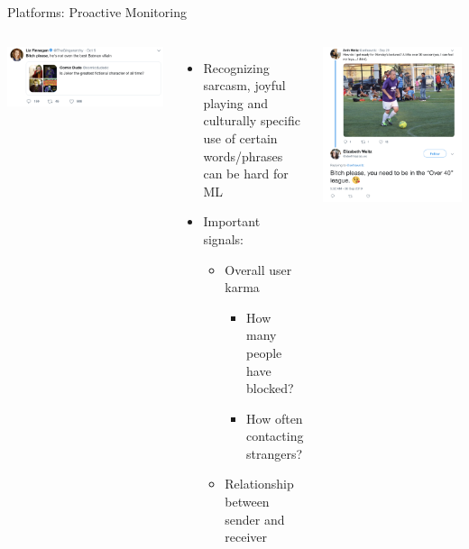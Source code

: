 \documentclass[nobackground,dvipsnames,table]{beamer}
\begin{document}
\begin{frame}{Platforms: Proactive Monitoring}
    \begin{columns}
            \includegraphics[width=\textwidth]{false-positive-1}
            \begin{itemize}
                \item Recognizing sarcasm, joyful playing and culturally specific use of certain words/phrases can be hard for ML
                \item Important signals: 
                \begin{itemize}
                    \item Overall user karma
                    \begin{itemize}
                        \item How many people have blocked?
                        \item How often contacting strangers?
                    \end{itemize}
                    \item Relationship between sender and receiver
                \end{itemize}
            \end{itemize}
            \includegraphics[width=\textwidth]{false-positive-2}

\end{columns}
\end{frame}
\end{document}
